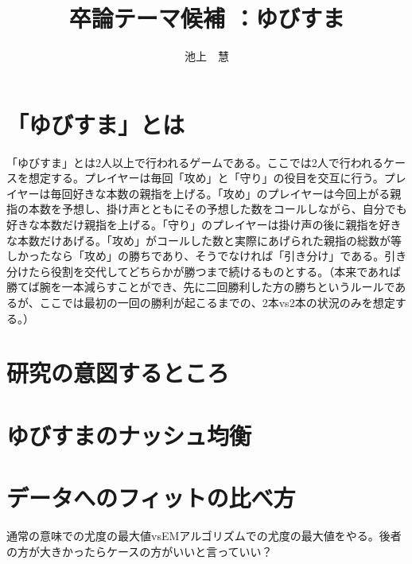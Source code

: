 \documentclass{jsarticle}
\begin{document}
\title{卒論テーマ候補 ：ゆびすま}
\author{池上　慧}
\maketitle

\section{「ゆびすま」とは}
「ゆびすま」とは2人以上で行われるゲームである。ここでは2人で行われるケースを想定する。プレイヤーは毎回「攻め」と「守り」の役目を交互に行う。プレイヤーは毎回好きな本数の親指を上げる。「攻め」のプレイヤーは今回上がる親指の本数を予想し、掛け声とともにその予想した数をコールしながら、自分でも好きな本数だけ親指を上げる。「守り」のプレイヤーは掛け声の後に親指を好きな本数だけあげる。「攻め」がコールした数と実際にあげられた親指の総数が等しかったなら「攻め」の勝ちであり、そうでなければ「引き分け」である。引き分けたら役割を交代してどちらかが勝つまで続けるものとする。（本来であれば勝てば腕を一本減らすことができ、先に二回勝利した方の勝ちというルールであるが、ここでは最初の一回の勝利が起こるまでの、2本vs2本の状況のみを想定する。）

\section{研究の意図するところ}

\section{ゆびすまのナッシュ均衡}

\section{データへのフィットの比べ方}
通常の意味での尤度の最大値vsEMアルゴリズムでの尤度の最大値をやる。後者の方が大きかったらケースの方がいいと言っていい？
\end{document}
